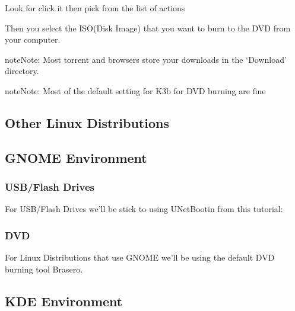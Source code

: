 \documentclass[letterpaper,10pt,english]{sphinxmanual}
\begin{document}
Look for  click it then pick  from the list of actions


Then you select the ISO(Disk Image) that you want to burn to the DVD from your computer.

\begin{notice}{note}{Note:}
Most torrent and browsers store your downloads in the `Download' directory.
\end{notice}

\begin{notice}{note}{Note:}
Most of the default setting for K3b for DVD burning are fine
\end{notice}


\subsection{Other Linux Distributions}
\label{docs/installation:other-linux-distributions}

\subsection{GNOME Environment}
\label{docs/installation:gnome-environment}

\subsubsection{USB/Flash Drives}
\label{docs/installation:id3}
For USB/Flash Drives we'll be stick to using UNetBootin from this tutorial: {\hyperref[docs/installation:usb\string-drives\string-link]{}}


\subsubsection{DVD}
\label{docs/installation:id4}

For Linux Distributions that use GNOME we'll be using the default DVD burning tool Brasero.


\subsection{KDE Environment}
\label{docs/installation:kde-environment}
\end{document}
